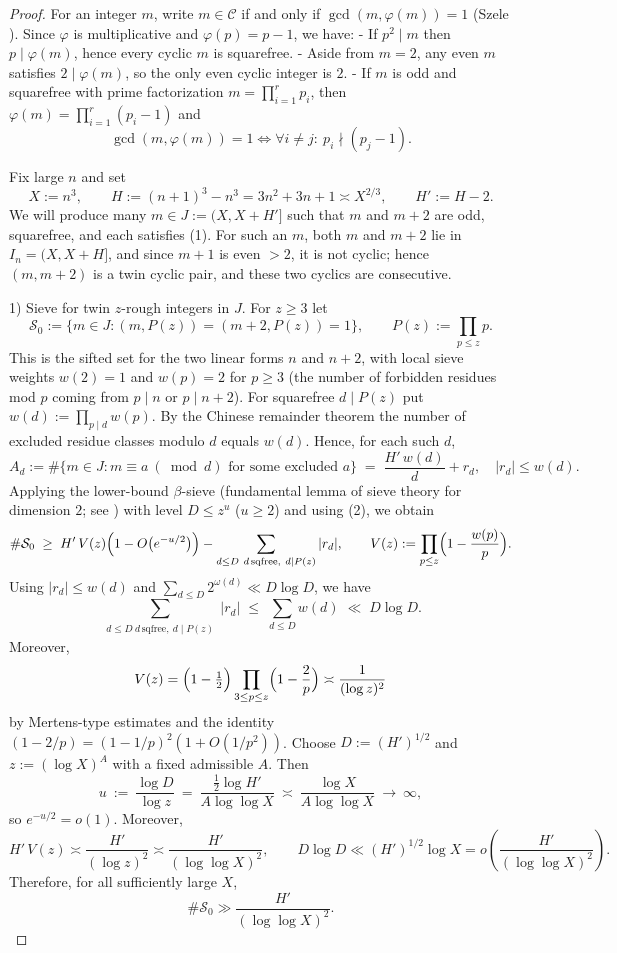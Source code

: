 \documentclass[12pt]{article}
\renewcommand{\tag}[1]{}
\theoremstyle{remark}
\begin{document}
\begin{proof}
For an integer $m$, write $m\in\mathcal C$ if and only if $\gcd(m,\varphi(m))=1$ (Szele \cite{Szele1947}). Since $\varphi$ is multiplicative and $\varphi(p)=p-1$, we have:
- If $p^2\mid m$ then $p\mid\varphi(m)$, hence every cyclic $m$ is squarefree.
- Aside from $m=2$, any even $m$ satisfies $2\mid\varphi(m)$, so the only even cyclic integer is $2$.
- If $m$ is odd and squarefree with prime factorization $m=\prod_{i=1}^r p_i$, then $\varphi(m)=\prod_{i=1}^r (p_i-1)$ and
  $$\gcd(m,\varphi(m))=1\iff \forall i\ne j:\ p_i\nmid (p_j-1).\tag{1}$$

Fix large $n$ and set
$$X:=n^3,\qquad H:=(n+1)^3-n^3=3n^2+3n+1\asymp X^{2/3},\qquad H':=H-2.$$
We will produce many $m\in J:=(X,X+H']$ such that $m$ and $m+2$ are odd, squarefree, and each satisfies (1). For such an $m$, both $m$ and $m+2$ lie in $I_n=(X,X+H]$, and since $m+1$ is even $>2$, it is not cyclic; hence $(m,m+2)$ is a twin cyclic pair, and these two cyclics are consecutive.

1) Sieve for twin $z$-rough integers in $J$. For $z\ge 3$ let
$$\mathcal{S}_0:=\{m\in J : (m,P(z))=(m+2,P(z))=1\},\qquad P(z):=\prod_{p\le z}p.$$
This is the sifted set for the two linear forms $n$ and $n+2$, with local sieve weights $w(2)=1$ and $w(p)=2$ for $p\ge 3$ (the number of forbidden residues mod $p$ coming from $p\mid n$ or $p\mid n+2$). For squarefree $d\mid P(z)$ put $w(d):=\prod_{p\mid d}w(p)$. By the Chinese remainder theorem the number of excluded residue classes modulo $d$ equals $w(d)$. Hence, for each such $d$,
$$A_d:=\#\{m\in J: m\equiv a\ (\bmod d)\text{ for some excluded }a\}\;=\;\frac{H'\,w(d)}{d}+r_d,\quad |r_d|\le w(d).\tag{2}$$
Applying the lower-bound $\beta$-sieve (fundamental lemma of sieve theory for dimension $2$; see \cite{Greaves2001,IK2004}) with level $D\le z^u$ ($u\ge 2$) and using (2), we obtain
$$\#\mathcal{S}_0\;\ge\;H'\,V(z)\Bigl(1-O\bigl(e^{-u/2}\bigr)\Bigr)-\sum_{\substack{d\le D\ d\,\text{sqfree},\ d\mid P(z)}}|r_d|,\qquad V(z):=\prod_{p\le z}\Bigl(1-\frac{w(p)}{p}\Bigr).\tag{3}$$
Using $|r_d|\le w(d)$ and $\sum_{d\le D}2^{\omega(d)}\ll D\log D$, we have
$$\sum_{\substack{d\le D\ d\,\text{sqfree},\ d\mid P(z)}}|r_d|\;\le\;\sum_{d\le D}w(d)\;\ll\;D\log D.\tag{4}$$
Moreover,
$$V(z)=\Bigl(1-\tfrac12\Bigr)\prod_{3\le p\le z}\Bigl(1-\frac{2}{p}\Bigr)\asymp \frac{1}{(\log z)^2}$$
by Mertens-type estimates \cite{Apostol1976} and the identity $(1-2/p)=(1-1/p)^2(1+O(1/p^2))$.
Choose $D:=(H')^{1/2}$ and $z:=(\log X)^A$ with a fixed admissible $A$. Then
\[
 u\ :=\ \frac{\log D}{\log z}\ =\ \frac{\tfrac12\log H'}{A\log\log X}\ \asymp\ \frac{\log X}{A\log\log X}\ \longrightarrow\ \infty,
\]
so $e^{-u/2}=o(1)$. Moreover,
$$H'\,V(z)\asymp \frac{H'}{(\log z)^2}\asymp \frac{H'}{(\log\log X)^2},\qquad D\log D\ll (H')^{1/2}\log X=o\!\left(\frac{H'}{(\log\log X)^2}\right).$$
Therefore, for all sufficiently large $X$,
$$\#\mathcal{S}_0\gg \frac{H'}{(\log\log X)^2}.\tag{5}$$


\end{proof}
\end{document}
